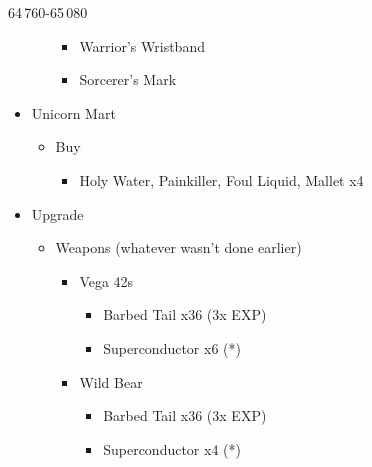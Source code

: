 \begin{multicols}{2}
\begin{shop}{64\,760-65\,080}
\begin{itemize}
\begin{itemize}
\begin{itemize}
                      \item Warrior's Wristband
                      \item Sorcerer's Mark
                    \end{itemize}
            \end{itemize}
      \item Unicorn Mart
            \begin{itemize}
              \item Buy
                    \begin{itemize}
                      \item Holy Water, Painkiller, Foul Liquid, Mallet x4
                    \end{itemize}
            \end{itemize}
    \end{itemize}
  \end{shop}

  \begin{upgrade}
    \begin{itemize}
      \item Upgrade
            \begin{itemize}
              \item Weapons (whatever wasn't done earlier)
                    \begin{itemize}
                      \item Vega 42s
                            \begin{itemize}
                              \item Barbed Tail x36 (3x EXP)
                              \item Superconductor x6 (*)
                            \end{itemize}
                      \item Wild Bear
                            \begin{itemize}
                              \item Barbed Tail x36 (3x EXP)
                              \item Superconductor x4 (*)
                            \end{itemize}


\end{itemize}
\end{itemize}
\end{itemize}
\end{upgrade}
\end{multicols}
